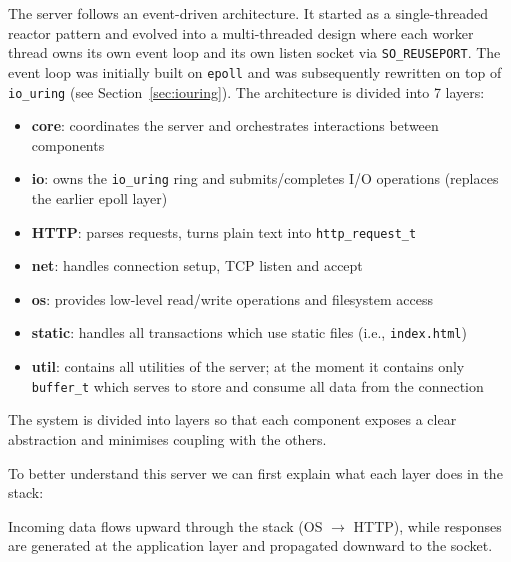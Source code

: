 \documentclass{article}
\begin{document}
The server follows an event-driven architecture. It started as a single-threaded reactor pattern and evolved into a multi-threaded design where each worker thread owns its own event loop and its own listen socket via \texttt{SO\_REUSEPORT}. The event loop was initially built on \texttt{epoll} and was subsequently rewritten on top of \texttt{io\_uring} (see Section~\ref{sec:iouring}). The architecture is divided into 7 layers:

\begin{itemize}
    \item \textbf{core}: coordinates the server and orchestrates interactions between components
    \item \textbf{io}: owns the \texttt{io\_uring} ring and submits/completes I/O operations
          (replaces the earlier epoll layer)
    \item \textbf{HTTP}: parses requests, turns plain text into \texttt{http\_request\_t}
    \item \textbf{net}: handles connection setup, TCP listen and accept
    \item \textbf{os}: provides low-level read/write operations and filesystem access
    \item \textbf{static}: handles all transactions which use static files (i.e., \texttt{index.html})
    \item \textbf{util}: contains all utilities of the server; at the moment it contains only
          \texttt{buffer\_t} which serves to store and consume all data from the connection
\end{itemize}

The system is divided into layers so that each component exposes a clear abstraction and
minimises coupling with the others.

\medskip
To better understand this server we can first explain what each layer does in the stack:

\begin{center}
\end{center}

\noindent Incoming data flows upward through the stack (OS $\to$ HTTP), while responses are
generated at the application layer and propagated downward to the socket.
\end{document}

